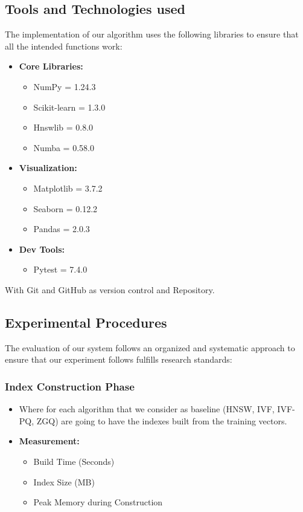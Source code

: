 \documentclass[conference]{IEEEtran}
\begin{document}
\subsection{Tools and Technologies used}
The implementation of our algorithm uses the following libraries to ensure that all the intended functions work:

\begin{itemize}
    \item \textbf{Core Libraries:}
    \begin{itemize}
        \item NumPy = 1.24.3
        \item Scikit-learn = 1.3.0
        \item Hnswlib = 0.8.0
        \item Numba = 0.58.0
    \end{itemize}
    \item \textbf{Visualization:}
    \begin{itemize}
        \item Matplotlib = 3.7.2
        \item Seaborn = 0.12.2
        \item Pandas = 2.0.3
    \end{itemize}
    \item \textbf{Dev Tools:}
    \begin{itemize}
        \item Pytest = 7.4.0
    \end{itemize}
\end{itemize}
With Git and GitHub as version control and Repository.

\subsection{Experimental Procedures}
The evaluation of our system follows an organized and systematic approach to ensure that our experiment follows fulfills research standards:

\subsubsection{Index Construction Phase}
\begin{itemize}
    \item Where for each algorithm that we consider as baseline (HNSW, IVF, IVF-PQ, ZGQ) are going to have the indexes built from the training vectors.
    \item \textbf{Measurement:}
    \begin{itemize}
        \item Build Time (Seconds)
        \item Index Size (MB)
        \item Peak Memory during Construction
    \end{itemize}
\end{itemize}
\end{document}
